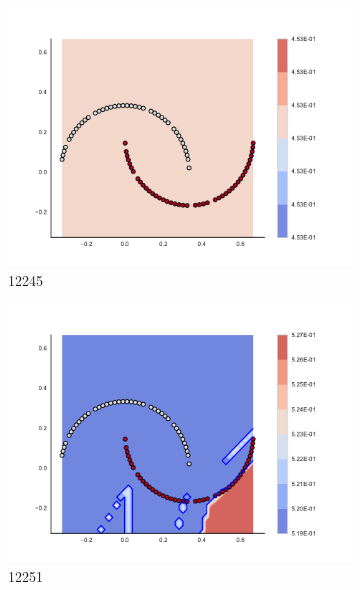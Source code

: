 \begin{figure}[h]
\begin{subfigure}[b]{0.09\textwidth}
    \includegraphics[clip, trim=2.35cm 1.75cm 4.5cm 0cm,width=\textwidth]{img/convergence/12245.pdf}
    \caption{12245}
    \label{fig:convergence_12245}
\end{subfigure}
%
\begin{subfigure}[b]{0.09\textwidth}
    \includegraphics[clip, trim=2.35cm 1.75cm 4.5cm 0cm,width=\textwidth]{img/convergence/12251.pdf}
    \caption{12251}
    \label{fig:convergence_12251}
\end{subfigure}
%
\begin{subfigure}[b]{0.09\textwidth}

\end{subfigure}
\end{figure}
